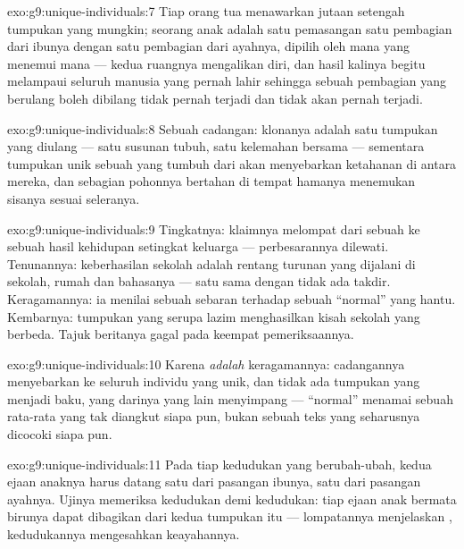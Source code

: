 \begin{solution}{exo:g9:unique-individuals:7}
Tiap orang tua menawarkan jutaan setengah tumpukan yang
mungkin; seorang anak adalah satu pemasangan satu pembagian
dari ibunya dengan satu pembagian dari ayahnya, dipilih oleh
 mana yang menemui  mana --- kedua ruangnya
mengalikan diri, dan hasil kalinya begitu melampaui seluruh
manusia yang pernah lahir sehingga sebuah pembagian yang
berulang boleh dibilang tidak pernah terjadi dan tidak akan
pernah terjadi.
\end{solution}

\begin{solution}{exo:g9:unique-individuals:8}
Sebuah cadangan: klonanya adalah satu tumpukan yang diulang
--- satu susunan tubuh, satu kelemahan bersama --- sementara
tumpukan unik sebuah  yang tumbuh dari  akan
menyebarkan ketahanan di antara mereka, dan sebagian
pohonnya bertahan di tempat hamanya menemukan sisanya sesuai
seleranya.
\end{solution}

\begin{solution}{exo:g9:unique-individuals:9}
Tingkatnya: klaimnya melompat dari sebuah  ke sebuah
hasil kehidupan setingkat keluarga --- perbesarannya
dilewati. Tenunannya: keberhasilan sekolah adalah rentang
turunan yang dijalani di sekolah, rumah dan bahasanya ---
satu  sama dengan tidak ada takdir. Keragamannya: ia
menilai sebuah sebaran terhadap sebuah ``normal'' yang
hantu. Kembarnya: tumpukan yang serupa lazim menghasilkan
kisah sekolah yang berbeda. Tajuk beritanya gagal pada
keempat pemeriksaannya.
\end{solution}

\begin{solution}{exo:g9:unique-individuals:10}
Karena  \emph{adalah} keragamannya: cadangannya
menyebarkan  ke seluruh individu yang unik, dan tidak
ada tumpukan yang menjadi baku, yang darinya yang lain
menyimpang --- ``normal'' menamai sebuah rata-rata yang tak
diangkut siapa pun, bukan sebuah teks yang seharusnya
dicocoki siapa pun.
\end{solution}

\begin{solution}{exo:g9:unique-individuals:11}
Pada tiap kedudukan yang berubah-ubah, kedua ejaan anaknya
harus datang satu dari pasangan ibunya, satu dari pasangan
ayahnya. Ujinya memeriksa kedudukan demi kedudukan: tiap
ejaan anak bermata birunya dapat dibagikan dari kedua
tumpukan itu --- lompatannya menjelaskan , kedudukannya
mengesahkan keayahannya.
\end{solution}

